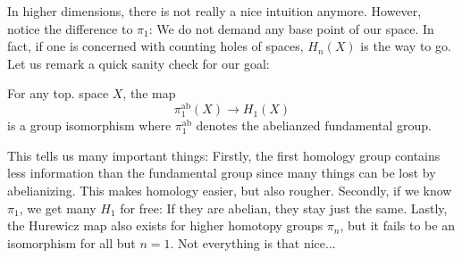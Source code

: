 In higher dimensions, there is not really a nice intuition anymore. However, notice the difference to $\pi_1$: We do not demand any base point of our space. In fact, if one is concerned with counting holes of spaces, $H_n(X)$ is the way to go. Let us remark a quick sanity check for our goal:
\begin{theorem}
    For any top. space $X$, the map $$\pi^\text{ab}_1(X) \to H_1(X)$$ is a group isomorphism where $\pi_1^\text{ab}$ denotes the abelianzed fundamental group.
\end{theorem}
This tells us many important things:
Firstly, the first homology group contains less information than the fundamental group since many things can be lost by abelianizing. This makes homology easier, but also rougher. Secondly, if we know $\pi_1$, we get many $H_1$ for free: If they are abelian, they stay just the same. Lastly, the Hurewicz map also exists for higher homotopy groups $\pi_n$, but it fails to be an isomorphism for all but $n=1$. Not everything is that nice...
